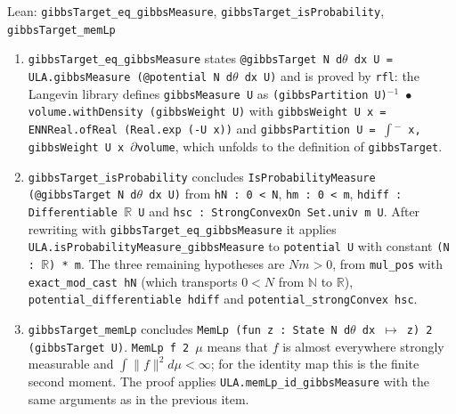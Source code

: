 \documentclass[11pt,a4paper]{article}
\begin{document}
\begin{leanbox}{Lean: \texttt{gibbsTarget\_\allowbreak{}eq\_\allowbreak{}gibbsMeasure}, \texttt{gibbsTarget\_\allowbreak{}isProbability}, \texttt{gibbsTarget\_\allowbreak{}memLp}}
\begin{enumerate}
\item \texttt{gibbs\allowbreak{}Target\_\allowbreak{}eq\_\allowbreak{}gibbs\allowbreak{}Measure} states \texttt{@gibbs\allowbreak{}Target N d\ensuremath{\theta} dx U = ULA.\allowbreak{}gibbs\allowbreak{}Measure (@potential N d\ensuremath{\theta} dx U)} and is proved by \texttt{rfl}: the Langevin library defines \texttt{gibbs\allowbreak{}Measure U} as \texttt{(gibbs\allowbreak{}Partition U)\ensuremath{{}^{-1}} \ensuremath{\bullet} volume.\allowbreak{}with\allowbreak{}Density (gibbs\allowbreak{}Weight U)} with \texttt{gibbs\allowbreak{}Weight U x = ENNReal.\allowbreak{}of\allowbreak{}Real (Real.\allowbreak{}exp (-\allowbreak{}U x))} and \texttt{gibbs\allowbreak{}Partition U = \ensuremath{\int}\ensuremath{{}^{-}} x, gibbs\allowbreak{}Weight U x \ensuremath{\partial}volume}, which unfolds to the definition of \texttt{gibbs\allowbreak{}Target}.

\item \texttt{gibbs\allowbreak{}Target\_\allowbreak{}is\allowbreak{}Probability} concludes \texttt{Is\allowbreak{}Probability\allowbreak{}Measure (@gibbs\allowbreak{}Target N d\ensuremath{\theta} dx U)} from \texttt{h\allowbreak{}N : 0 < N}, \texttt{hm : 0 < m}, \texttt{hdiff : Differentiable \ensuremath{\mathbb R} U} and \texttt{hsc : Strong\allowbreak{}Convex\allowbreak{}On Set.\allowbreak{}univ m U}. After rewriting with \texttt{gibbs\allowbreak{}Target\_\allowbreak{}eq\_\allowbreak{}gibbs\allowbreak{}Measure} it applies \texttt{ULA.\allowbreak{}is\allowbreak{}Probability\allowbreak{}Measure\_\allowbreak{}gibbs\allowbreak{}Measure} to \texttt{potential U} with constant \texttt{(N : \ensuremath{\mathbb R}) * m}. The three remaining hypotheses are \(Nm>0\), from \texttt{mul\_\allowbreak{}pos} with \texttt{exact\_\allowbreak{}mod\_\allowbreak{}cast h\allowbreak{}N} (which transports \(0<N\) from \(\mathbb N\) to \(\mathbb R\)), \texttt{potential\_\allowbreak{}differentiable hdiff} and \texttt{potential\_\allowbreak{}strong\allowbreak{}Convex hsc}.

\item \texttt{gibbs\allowbreak{}Target\_\allowbreak{}mem\allowbreak{}Lp} concludes \texttt{Mem\allowbreak{}Lp (fun z : State N d\ensuremath{\theta} dx \ensuremath{\mapsto} z) 2 (gibbs\allowbreak{}Target U)}. \texttt{Mem\allowbreak{}Lp f 2 \ensuremath{\mu}} means that \(f\) is almost everywhere strongly measurable and \(\int\|f\|^2d\mu<\infty\); for the identity map this is the finite second moment. The proof applies \texttt{ULA.\allowbreak{}mem\allowbreak{}Lp\_\allowbreak{}id\_\allowbreak{}gibbs\allowbreak{}Measure} with the same arguments as in the previous item.

\end{enumerate}
\end{leanbox}
\end{document}
